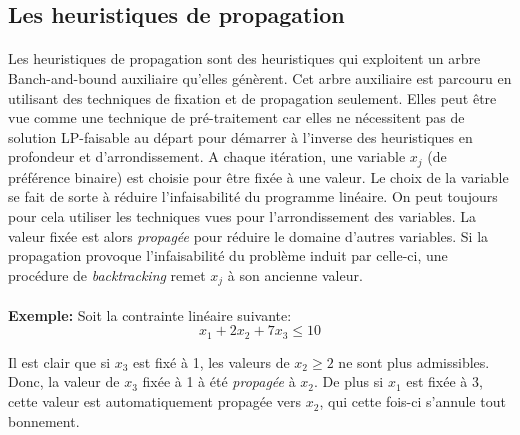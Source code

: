 \documentclass[12pt,a4paper,oneside]{book}
\theoremstyle{definition}
\begin{document}
	\subsection{Les heuristiques de propagation}
	\paragraph{}
	Les heuristiques de propagation sont des heuristiques qui exploitent un arbre Banch-and-bound auxiliaire qu'elles génèrent. Cet arbre auxiliaire est parcouru en utilisant des techniques de fixation et de propagation seulement. Elles peut être vue comme une technique de pré-traitement car elles ne nécessitent pas de solution LP-faisable au départ pour démarrer à l'inverse des heuristiques en profondeur et d'arrondissement. A chaque itération, une variable $x_j$ (de préférence binaire) est choisie pour être fixée à une valeur. Le choix de la variable se fait de sorte à réduire l'infaisabilité du programme linéaire. On peut toujours pour cela utiliser les techniques vues pour l'arrondissement des variables. La valeur fixée est alors \textit{propagée} pour réduire le domaine d'autres variables. Si la propagation provoque l'infaisabilité du problème induit par celle-ci, une procédure de \textit{backtracking} remet $x_j$ à son ancienne valeur. \\
	\paragraph{}
	\textbf{Exemple:} Soit la contrainte linéaire suivante:\\
	\[
		x_1 + 2 x_2 + 7 x_3 \leq 10 
	\]
	
	Il est clair que si $x_3$ est fixé à 1, les valeurs de $x_2 \geq 2 $ ne sont plus admissibles. Donc, la valeur de $x_3$ fixée à 1 à été \textit{propagée} à $x_2$. De plus si $x_1$ est fixée à 3, cette valeur est automatiquement propagée vers $x_2$, qui cette fois-ci s'annule tout bonnement.
	
\end{document}
